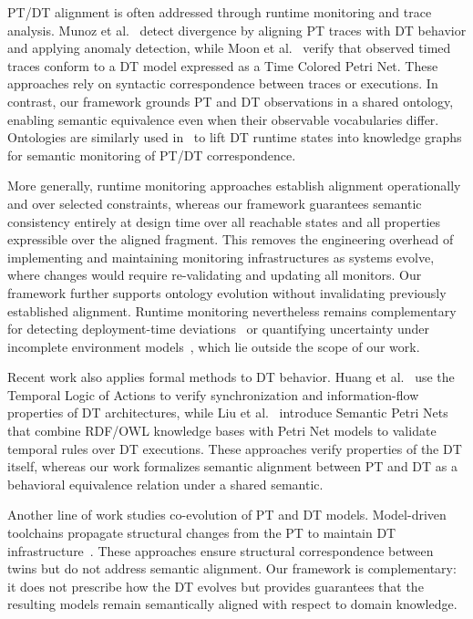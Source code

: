 PT/DT alignment is often addressed through runtime monitoring and trace analysis. Munoz et al.~\cite{10.1145/3652620.3688267} detect divergence by aligning PT traces with DT behavior and applying anomaly detection, while Moon et al.~\cite{moon2023consistency} verify that observed timed traces conform to a DT model expressed as a Time Colored Petri Net. These approaches rely on syntactic correspondence between traces or executions. In contrast, our framework grounds PT and DT observations in a shared ontology, enabling semantic equivalence even when their observable vocabularies differ. Ontologies are similarly used in~\cite{kamburjan2022twinningbyconstruction,Gil2025} to lift DT runtime states into knowledge graphs for semantic monitoring of PT/DT correspondence.

More generally, runtime monitoring approaches establish alignment operationally and over selected constraints, whereas our framework guarantees semantic consistency entirely at design time over all reachable states and all properties expressible over the aligned fragment. This removes the engineering overhead of implementing and maintaining monitoring infrastructures as systems evolve, where changes would require re-validating and updating all monitors. Our framework further supports ontology evolution without invalidating previously established alignment. Runtime monitoring nevertheless remains complementary for detecting deployment-time deviations~\cite{10.1145/3735948.3736156} or quantifying uncertainty under incomplete environment models~\cite{Woodcock2021}, which lie outside the scope of our work.

Recent work also applies formal methods to DT behavior. Huang et al.~\cite{huang2024formaldt} use the Temporal Logic of Actions to verify synchronization and information-flow properties of DT architectures, while Liu et al.~\cite{liu2023spn} introduce Semantic Petri Nets that combine RDF/OWL knowledge bases with Petri Net models to validate temporal rules over DT executions. These approaches verify properties of the DT itself, whereas our work formalizes semantic alignment between PT and DT as a behavioral equivalence relation under a shared semantic.


Another line of work studies co-evolution of PT and DT models. Model-driven toolchains propagate structural changes from the PT to maintain DT infrastructure~\cite{lehner2021aml4dt,Mertens2024}. These approaches ensure structural correspondence between twins but do not address semantic alignment. Our framework is complementary: it does not prescribe how the DT evolves but provides guarantees that the resulting models remain semantically aligned with respect to domain knowledge.



